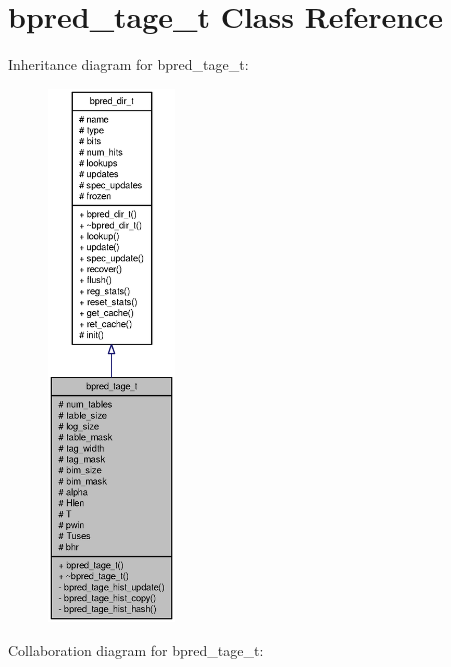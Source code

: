 \section{bpred\_\-tage\_\-t Class Reference}
\label{classbpred__tage__t}
Inheritance diagram for bpred\_\-tage\_\-t:\nopagebreak
\begin{figure}[H]
\begin{center}
\leavevmode
\includegraphics[height=400pt]{classbpred__tage__t__inherit__graph}
\end{center}
\end{figure}
Collaboration diagram for bpred\_\-tage\_\-t:\nopagebreak

